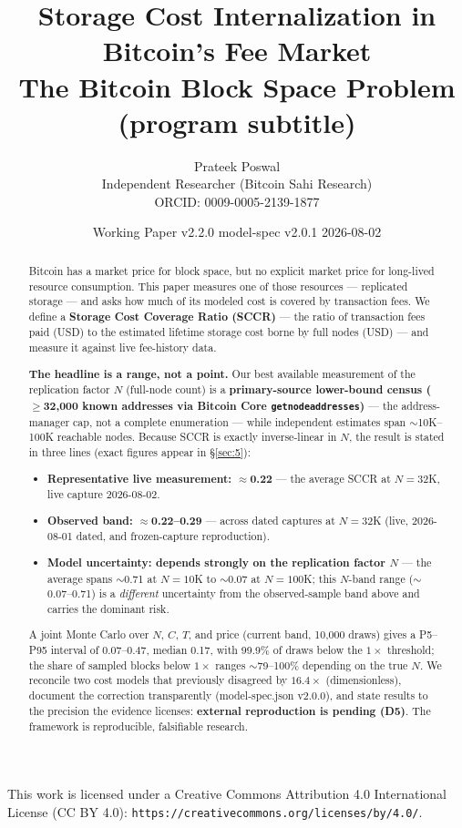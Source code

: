 \documentclass[11pt]{article}
\title{\textbf{Storage Cost Internalization in Bitcoin's Fee Market}\\[0.4em] \large The Bitcoin Block Space Problem (program subtitle)}
\author{Prateek Poswal\\ \small Independent Researcher (Bitcoin Sahi Research)\\ \small ORCID: 0009-0005-2139-1877}
\date{Working Paper v2.2.0 \textbullet{} model-spec v2.0.1 \textbullet{} 2026-08-02}
\begin{document}
\maketitle
\vspace{-2em}
{\footnotesize This work is licensed under a Creative Commons Attribution 4.0 International License (CC BY 4.0): \texttt{https://creativecommons.org/licenses/by/4.0/}.}
\vspace{1em}

\begin{abstract}
Bitcoin has a market price for block space, but no explicit market price for long-lived resource consumption. This paper measures one of those resources --- replicated storage --- and asks how much of its modeled cost is covered by transaction fees. We define a \textbf{Storage Cost Coverage Ratio (SCCR)} --- the ratio of transaction fees paid (USD) to the estimated lifetime storage cost borne by full nodes (USD) --- and measure it against live fee-history data.

\textbf{The headline is a range, not a point.} Our best available measurement of the replication factor $N$ (full-node count) is a \textbf{primary-source lower-bound census ($\geq$32{,}000 known addresses via Bitcoin Core \texttt{getnodeaddresses})} --- the address-manager cap, not a complete enumeration --- while independent estimates span $\sim$10K--100K reachable nodes. Because SCCR is exactly inverse-linear in $N$, the result is stated in three lines (exact figures appear in \S\ref{sec:5}):

\begin{itemize}
\item \textbf{Representative live measurement: $\approx$0.22} --- the average SCCR at $N=32$K, live capture 2026-08-02.
\item \textbf{Observed band: $\approx$0.22--0.29} --- across dated captures at $N=32$K (live, 2026-08-01 dated, and frozen-capture reproduction).
\item \textbf{Model uncertainty: depends strongly on the replication factor $N$} --- the average spans $\sim$0.71 at $N=10$K to $\sim$0.07 at $N=100$K; this $N$-band range ($\sim$0.07--0.71) is a \emph{different} uncertainty from the observed-sample band above and carries the dominant risk.
\end{itemize}

A joint Monte Carlo over $N$, $C$, $T$, and price (current band, 10{,}000 draws) gives a P5--P95 interval of 0.07--0.47, median 0.17, with 99.9\% of draws below the $1\times$ threshold; the share of sampled blocks below $1\times$ ranges $\sim$79--100\% depending on the true $N$. We reconcile two cost models that previously disagreed by $16.4\times$ (dimensionless), document the correction transparently (model-spec.json v2.0.0), and state results to the precision the evidence licenses: \textbf{external reproduction is pending (D5)}. The framework is reproducible, falsifiable research.
\end{abstract}
\end{document}
